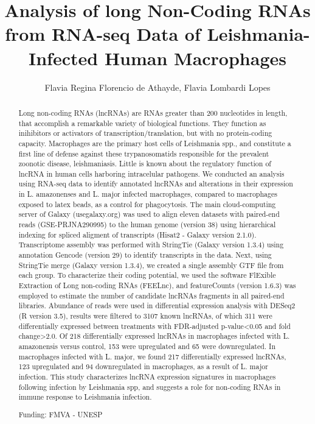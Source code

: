 \documentclass[twoside]{article}
\title{\vspace{-15mm}\fontsize{24pt}{10pt}\selectfont\textbf{ Analysis of long Non-Coding RNAs from RNA-seq Data of Leishmania-Infected Human Macrophages }} %
\author{ Flavia Regina Florencio de Athayde, Flavia Lombardi Lopes }
\affil{ FMVA-Unesp }
\date{}
\begin{document}
  
  
  \maketitle %
  
  
  \thispagestyle{fancy} %
  
  
  \begin{abstract}
  Long non-coding RNAs (lncRNAs) are RNAs greater than 200 nucleotides in length,  that accomplish a remarkable variety of biological functions. They function as inihibitors or activators of transcription/translation,  but with no protein-coding capacity. Macrophages are the primary host cells of Leishmania spp.,  and constitute a first line of defense against these trypanosomatids responsible for the prevalent zoonotic disease,  leishmaniasis. Little is known about the regulatory function of lncRNA in human cells harboring intracelular pathogens. We conducted an analysis using RNA-seq data to identify annotated lncRNAs and alterations in their expression in L. amazonenses and L. major infected macrophages,  compared to macrophages exposed to latex beads,  as a control for phagocytosis. The main cloud-computing server of Galaxy (usegalaxy.org) was used to align eleven datasets with paired-end reads (GSE-PRJNA290995) to the human genome (version 38) using hierarchical indexing for spliced aligment of transcripts (Hisat2 - Galaxy version 2.1.0). Transcriptome assembly was performed with StringTie (Galaxy version 1.3.4) using annotation Gencode (version 29) to identify transcripts in the data. Next,  using StringTie merge (Galaxy version 1.3.4),  we created a single assembly GTF file from each group. To characterize their coding potential,  we used the software FlExible Extraction of Long non-coding RNAs (FEELnc),  and featureCounts (version 1.6.3) was employed to estimate the number of candidate lncRNAs fragments in all paired-end libraries. Abundance of reads were used in differential expression analysis with DESeq2 (R version 3.5),  results were filtered to 3107 known lncRNAs,  of which 311 were differentially expressed between treatments with FDR-adjusted p-value<0.05 and fold change>2.0. Of 218 differentially expressed lncRNAs in macrophages infected with L. amazonensis versus control,  153 were upregulated and 65 were downregulated. In macrophages infected with L. major,  we found 217 differentially expressed lncRNAs,  123 upregulated and 94 downregulated in macrophages,  as a result of L. major infection. This study characterizes lncRNA expression signatures in macrophages following infection by Leishmania spp,  and suggests a role for non-coding RNAs in immune response to Leishmania infection.
  
  Funding: FMVA - UNESP \\ 
  \end{abstract}
  
\end{document}
